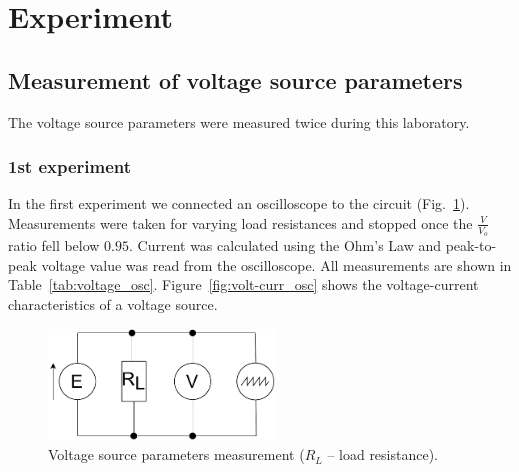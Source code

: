 \section{Experiment}

\subsection{Measurement of voltage source parameters}

The voltage source parameters were measured twice during this laboratory. 

\subsubsection*{1st experiment}

In the first experiment we connected an oscilloscope to the circuit (Fig.~\ref{fig:voltage_osc}). Measurements were taken for varying load resistances and stopped once the $\frac{V}{V_o}$ ratio fell below $0.95$. Current was calculated using the Ohm's Law and peak-to-peak voltage value was read from the oscilloscope. All measurements are shown in Table~\ref{tab:voltage_osc}. Figure~\ref{fig:volt-curr_osc} shows the voltage-current characteristics of a voltage source. 

\begin{figure}[H]
	\centering
	\includegraphics[width=6cm]{schematics/1.pdf}
	\caption{Voltage source parameters measurement ($R_L$ -- load resistance).}
	\label{fig:voltage_osc}
\end{figure}

